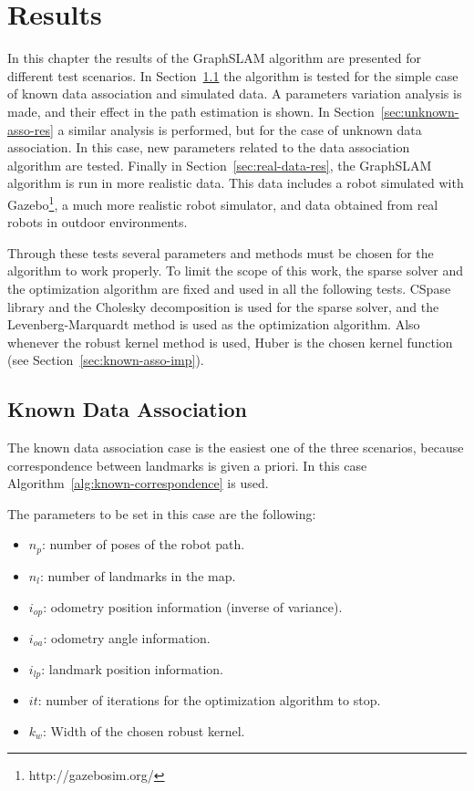 \chapter{Results}
\label{chap:results}

In this chapter the results of the GraphSLAM algorithm are presented for different test scenarios. In Section~\ref{sec:known-asso-res} the algorithm is tested for the simple case of known data association and simulated data. A parameters variation analysis is made, and their effect in the path estimation is shown. In Section~\ref{sec:unknown-asso-res} a similar analysis is performed, but for the case of unknown data association. In this case, new parameters related to the data association algorithm are tested. Finally in Section~\ref{sec:real-data-res}, the GraphSLAM algorithm is run in more realistic data. This data includes a robot simulated with Gazebo\footnote{http://gazebosim.org/}, a much more realistic robot simulator, and data obtained from real robots in outdoor environments. 

Through these tests several parameters and methods must be chosen for the algorithm to work properly. To limit the scope of this work, the sparse solver and the optimization algorithm are fixed and used in all the following tests. CSpase library and the Cholesky decomposition is used for the sparse solver, and the Levenberg-Marquardt method is used as the optimization algorithm. Also whenever the robust kernel method is used, Huber is the chosen kernel function (see Section~\ref{sec:known-asso-imp}). 

\section{Known Data Association}
\label{sec:known-asso-res}

The known data association case is the easiest one of the three scenarios, because correspondence between landmarks is given a priori. In this case Algorithm~\ref{alg:known-correspondence} is used. 

The parameters to be set in this case are the following:

\begin{itemize}
    \item $n_p$: number of poses of the robot path.
    \item $n_l$: number of landmarks in the map.
    \item $i_{op}$: odometry position information (inverse of variance).
    \item $i_{oa}$: odometry angle information.
    \item $i_{lp}$: landmark position information.
    \item $it$: number of iterations for the optimization algorithm to stop.
    \item $k_w$: Width of the chosen robust kernel.
\end{itemize}

